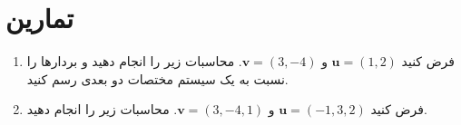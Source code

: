 \section{\textbf{تمارین}}
{
    \Large
    \begin{spacing}{1.5}
        \begin{enumerate}[label=\textbf{\arabic*}.]
            \item {فرض کنید $\textbf{u}=(1,2)$ و $\textbf{v}=(3,-4)$. محاسبات زیر را انجام دهید و بردارها را نسبت به یک سیستم مختصات دو بعدی رسم کنید.}
            \begin{flushleft}
            \end{flushleft} \textbf{\vspace{-12pt}}

            \item {فرض کنید $\textbf{u}=(-1,3,2)$ و $\textbf{v}=(3,-4,1)$. محاسبات زیر را انجام دهید.}
            \begin{flushleft}
            \end{flushleft} \textbf{\vspace{-12pt}}


\end{enumerate}
\end{spacing}}
